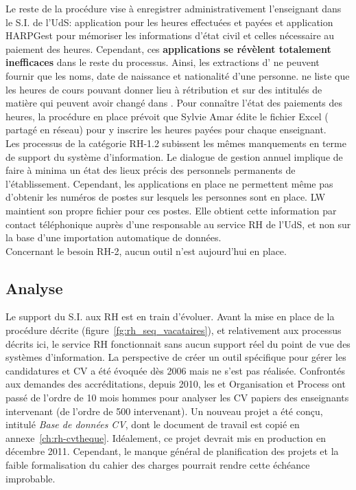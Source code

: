 \documentclass{book}
\begin{document}
Le reste de la procédure vise à enregistrer administrativement l'enseignant dans
le  S.I. de  l'UdS: application    pour les  heures effectuées  et
payées et application  HARPGest pour mémoriser les informations  d'état civil et
celles nécessaire  au paiement des heures.   Cependant, ces \textbf{applications
  se révèlent  totalement inefficaces}  dans le reste  du processus.  Ainsi, les
extractions  d'  ne  peuvent  fournir que  les  noms,  date  de
naissance et nationalité d'une personne.   ne liste que les heures
de cours pouvant donner  lieu à rétribution et sur des  intitulés de matière qui
peuvent avoir changé dans .   Pour connaître l'état des paiements
des heures, la procédure en place prévoit que Sylvie Amar édite le fichier Excel
(\index{\clecommun} partagé  en réseau) pour  y inscrire les heures  payées pour
chaque enseignant.\\

Les processus de la catégorie RH-1.2 subissent les mêmes manquements en terme de
support  du système  d'information. Le  dialogue de  gestion annuel  implique de
faire  à  minima  un  état  des   lieux  précis  des  personnels  permanents  de
l'établissement. Cependant,  les applications  en place  ne permettent  même pas
d'obtenir les  numéros de postes sur  lesquels les personnes sont  en place.  LW
maintient son propre fichier pour ces postes. Elle obtient cette information par
contact téléphonique auprès d'une responsable au service RH de l'UdS, et non sur
la base d'une importation automatique de données.\\

Concernant le besoin RH-2, aucun outil n'est aujourd'hui en place.

\subsection{Analyse}
\label{sc:rh-analyse}
Le support du S.I.  aux RH est en train d'évoluer. Avant la  mise en place de la
procédure  décrite  (figure~\ref{fg:rh_seq_vacataires}),   et  relativement  aux
processus décrits  ici, le service  RH fonctionnait  sans aucun support  réel du
point  de vue  des  systèmes d'information.  La perspective  de  créer un  outil
spécifique pour  gérer les  candidatures et CV  a été évoquée  dès 2006  mais ne
s'est pas  réalisée.  Confrontés aux  demandes des accréditations,  depuis 2010,
les \srh et Organisation et Process ont  passé de l'ordre de 10 mois hommes pour
analyser  les  CV  papiers  des  enseignants  intervenant  (de  l'ordre  de  500
intervenant).  Un nouveau  projet a été conçu, intitulé  \textit{Base de données
  CV}, dont  le document  de travail  est copié  en annexe~\ref{ch:rh-cvtheque}.
Idéalement, ce projet devrait mis en production en décembre 2011.  Cependant, le
manque général de planification des projets et la faible formalisation du cahier
des charges pourrait rendre cette échéance improbable.\\
\end{document}
